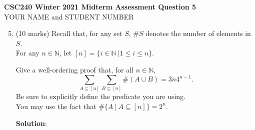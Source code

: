 \documentclass[11pt]{article}
\def\nats{{\mathbb N}}
\begin{document}
\begin{center}
{\bf \Large \bf CSC240 Winter 2021 Midterm Assessment Question 5}\\
YOUR NAME and STUDENT NUMBER
\end{center}

\medskip

\begin{enumerate}
\setcounter{enumi}{4}

\item
\begin{question}
(10 marks)
Recall that, for any set $S$,  $\#S$ denotes the number of elements in $S$.\\
For any $n \in \nats$, let $[n] = \{i \in \nats\ | 1 \leq i \leq n\}$.

Give a well-ordering proof  that, for all $n \in \nats$, 
$$\sum_{A\subseteq [n]} \sum_{B\subseteq [n]} \#(A \cup B) = 3n4^{n-1}.$$
Be sure to explicitly define the predicate you are using.\\
You may use the fact that $\#\{A\ |\ A \subseteq [n]\} = 2^n$.
\end{question}

\begin{solution}
{\bf Solution}:

\end{solution}
\end{enumerate}
\end{document}
